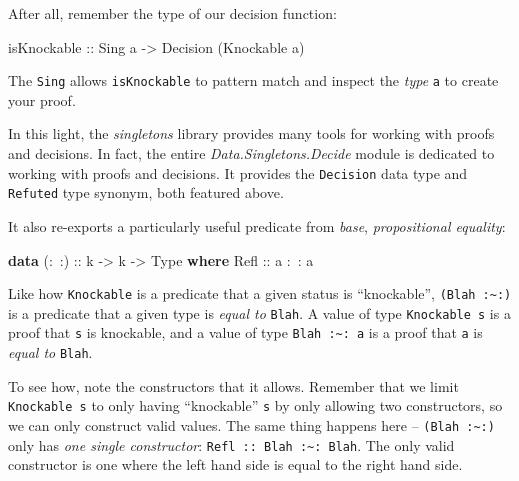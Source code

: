 \documentclass[]{article}
\newenvironment{Shaded}{}{}
\newcommand{\DataTypeTok}[1]{\textcolor[rgb]{0.56,0.13,0.00}{#1}}
\newcommand{\FunctionTok}[1]{\textcolor[rgb]{0.02,0.16,0.49}{#1}}
\newcommand{\KeywordTok}[1]{\textcolor[rgb]{0.00,0.44,0.13}{\textbf{#1}}}
\newcommand{\NormalTok}[1]{#1}
\newcommand{\OtherTok}[1]{\textcolor[rgb]{0.00,0.44,0.13}{#1}}
\begin{document}
After all, remember the type of our decision function:

\begin{Shaded}
\begin{Highlighting}[]
\OtherTok{isKnockable ::} \DataTypeTok{Sing}\NormalTok{ a }\OtherTok{->} \DataTypeTok{Decision}\NormalTok{ (}\DataTypeTok{Knockable}\NormalTok{ a)}
\end{Highlighting}
\end{Shaded}

The \texttt{Sing} allows \texttt{isKnockable} to pattern match and inspect the
\emph{type} \texttt{a} to create your proof.

In this light, the \emph{singletons} library provides many tools for working
with proofs and decisions. In fact, the entire \emph{Data.Singletons.Decide}
module is dedicated to working with proofs and decisions. It provides the
\texttt{Decision} data type and \texttt{Refuted} type synonym, both featured
above.

It also re-exports a particularly useful predicate from \emph{base},
\emph{propositional equality}:

\begin{Shaded}
\begin{Highlighting}[]
\KeywordTok{data}\OtherTok{ (:~:) ::}\NormalTok{ k }\OtherTok{->}\NormalTok{ k }\OtherTok{->} \DataTypeTok{Type} \KeywordTok{where}
    \DataTypeTok{Refl}\OtherTok{ ::}\NormalTok{ a }\FunctionTok{:~:}\NormalTok{ a}
\end{Highlighting}
\end{Shaded}

Like how \texttt{Knockable} is a predicate that a given status is ``knockable'',
\texttt{(\textquotesingle{}Blah\ :\textasciitilde{}:)} is a predicate that a
given type is \emph{equal to} \texttt{\textquotesingle{}Blah}. A value of type
\texttt{Knockable\ s} is a proof that \texttt{s} is knockable, and a value of
type \texttt{\textquotesingle{}Blah\ :\textasciitilde{}:\ a} is a proof that
\texttt{a} is \emph{equal to} \texttt{\textquotesingle{}Blah}.

To see how, note the constructors that it allows. Remember that we limit
\texttt{Knockable\ s} to only having ``knockable'' \texttt{s} by only allowing
two constructors, so we can only construct valid values. The same thing happens
here -- \texttt{(\textquotesingle{}Blah\ :\textasciitilde{}:)} only has
\emph{one single constructor}:
\texttt{Refl\ ::\ \textquotesingle{}Blah\ :\textasciitilde{}:\ \textquotesingle{}Blah}.
The only valid constructor is one where the left hand side is equal to the right
hand side.
\end{document}
